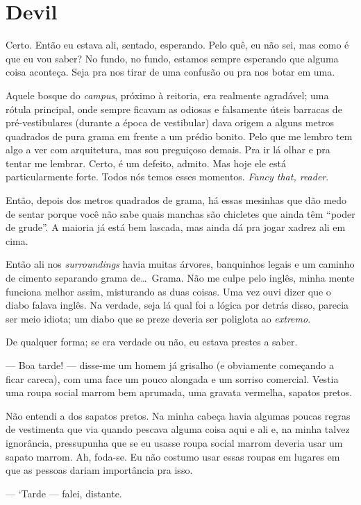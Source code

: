\chapter{Devil}

Certo. Então eu estava ali, sentado, esperando. Pelo quê, eu não sei, mas como é que eu vou saber? No fundo, no fundo, estamos sempre esperando que alguma coisa aconteça. Seja pra nos tirar de uma confusão ou pra nos botar em uma.

Aquele bosque do \emph{campus}, próximo à reitoria, era realmente agradável; uma rótula principal, onde sempre ficavam as odiosas e falsamente úteis barracas de pré-vestibulares (durante a época de vestibular) dava origem a alguns metros quadrados de pura grama em frente a um prédio bonito. Pelo que me lembro tem algo a ver com arquitetura, mas sou preguiçoso demais. Pra ir lá olhar e pra tentar me lembrar. Certo, é um defeito, admito. Mas hoje ele está particularmente forte. Todos nós temos esses momentos. \emph{Fancy that, reader}.

Então, depois dos metros quadrados de grama, há essas mesinhas que dão medo de sentar porque você não sabe quais manchas são chicletes que ainda têm ``poder de grude''. A maioria já está bem lascada, mas ainda dá pra jogar xadrez ali em cima.

Então ali nos \emph{surroundings} havia muitas árvores, banquinhos legais e um caminho de cimento separando grama de\ldots \ Grama. Não me culpe pelo inglês, minha mente funciona melhor assim, misturando as duas coisas. Uma vez ouvi dizer que o diabo falava inglês. Na verdade, seja lá qual foi a lógica por detrás disso, parecia ser meio idiota; um diabo que se preze deveria ser poliglota ao \emph{extremo}.

De qualquer forma; se era verdade ou não, eu estava prestes a saber.

--- Boa tarde! --- disse-me um homem já grisalho (e obviamente começando a ficar careca), com uma face um pouco alongada e um sorriso comercial. Vestia uma roupa social marrom bem aprumada, uma gravata vermelha, sapatos pretos.

Não entendi a dos sapatos pretos. Na minha cabeça havia algumas poucas regras de vestimenta que via quando pescava alguma coisa aqui e ali e, na minha talvez ignorância, pressupunha que se eu usasse roupa social marrom deveria usar um sapato marrom. Ah, foda-se. Eu não costumo usar essas roupas em lugares em que as pessoas dariam importância pra isso.

--- ‘Tarde --- falei, distante.

